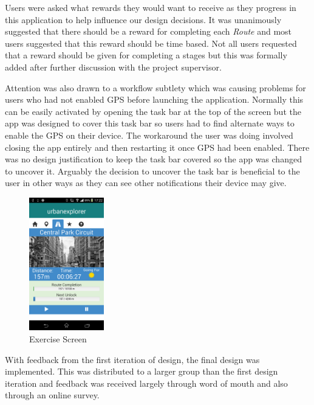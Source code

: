 Users were asked what rewards they would want to receive as they
progress in this application to help influence our design
decisions. It was unanimously suggested that there should be a reward
for completing each \emph{Route} and most users suggested that this
reward should be time based. Not all users requested that a reward
should be given for completing a stages but this was formally added
after further discussion with the project supervisor. 

Attention was also drawn to a workflow subtlety which was causing
problems for users who had not enabled GPS before launching the
application. Normally this can be easily activated by opening the
task bar at the top of the screen but the app was designed to cover
this task bar so users had to find alternate ways to enable the GPS on
their device. The workaround the user was doing involved closing the
app entirely and then restarting it once GPS had been enabled. There
was no design justification to keep the task bar covered so the
app was changed to uncover it. Arguably the decision to uncover the
task bar is beneficial to the user in other ways as they can see other
notifications their device may give.

\begin{figure}
  \vspace{-20pt}
  \centering
  \includegraphics[width=0.29\textwidth]{images/screens/run.png}
  \vspace{-20pt}
  \caption{Exercise Screen}
  \vspace{-35pt}
  \label{fig:final_run}
\end{figure}

With feedback from the first iteration of design, the final design was
implemented. This was distributed to a larger group than the first
design iteration and feedback was received largely through word of mouth
and also through an online survey.

